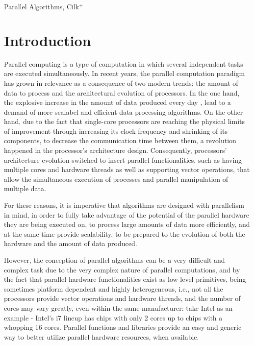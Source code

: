\documentclass[conference,compsoc]{IEEEtran}
\begin{document}
\IEEEpeerreviewmaketitle

\begin{IEEEkeywords}
Parallel Algorithms, Cilk$^+$
\end{IEEEkeywords}%


\section{Introduction}

Parallel computing is a type of computation in which several independent tasks are executed simultaneously. In recent years, the parallel computation paradigm has grown in relevance as a consequence of two modern trends: the amount of data to process and the architectural evolution of processors.
In the one hand, the explosive increase in the amount of data produced every day \cite{mcafee2012big}, lead to a demand of more scalabel and efficient data processing algorithms. %
On the other hand, due to the fact that single-core processors are reaching the physical limits of improvement through increasing its clock frequency and shrinking of its components, to decrease the communication time between them, a revolution happened in the processor's architecture design. Consequently, processors' architecture evolution switched to insert parallel functionalities, such as having multiple cores and hardware threads as well as supporting vector operations, that allow the simultaneous execution of processes and parallel manipulation of multiple data.

For these reasons, it is imperative that algorithms are designed with parallelism in mind, in order to fully take advantage of the potential of the parallel hardware they are being executed on, to process large amounts of data more efficiently, and at the same time provide scalability, to be prepared to the evolution of both the hardware and the amount of data produced.

However, the conception of parallel algorithms can be a very difficult and complex task due to the very complex nature of parallel computations, and by the fact that parallel hardware functionalities exist as low level primitives, being sometimes platform dependent and highly heterogeneous, i.e., not all the processors provide vector operations and hardware threads, and the number of cores may vary greatly, even within the same manufacturer: take Intel as an example - Intel's i7 lineup has chips with only 2 cores up to chips with a whopping 16 cores. Parallel functions and libraries provide an easy and generic way to better utilize parallel hardware resources, when available.
\end{document}
